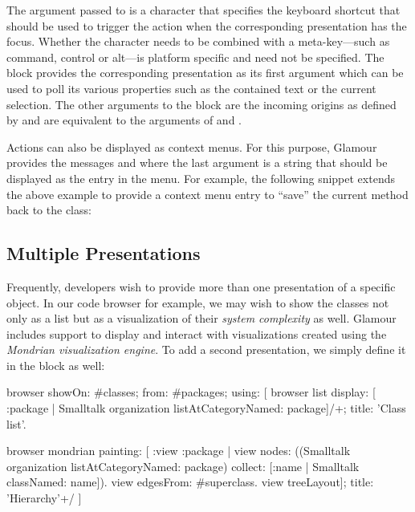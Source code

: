 \documentclass[a4paper,10pt,twoside]{book}
\begin{document}
The argument passed to  is a character that specifies the
keyboard shortcut that should be used to trigger the action when the
corresponding presentation has the focus. Whether the character needs
to be combined with a meta-key---such as command, control or alt---is
platform specific and need not be specified. The  block
provides the corresponding presentation as its first argument which
can be used to poll its various properties such as the contained text
or the current selection. The other arguments to the block are the
incoming origins as defined by  and are equivalent to the
arguments of  and .

Actions can also be displayed as context menus. For this purpose,
Glamour provides the messages  and
 where the last argument is a string that should be
displayed as the entry in the menu. For example, the following snippet
extends the above example to provide a context menu entry to ``save''
the current method back to the class:

\subsection{Multiple Presentations}

Frequently, developers wish to provide more than one presentation of a
specific object. In our code browser for example, we may wish to show
the classes not only as a list but as a visualization of their
\emph{system complexity} as well. Glamour includes support to display
and interact with visualizations created using the \emph{Mondrian
  visualization engine}. To add a second presentation, we simply
define it in the  block as well:

\begin{code}{}
browser showOn: #classes; from: #packages; using: [
	browser list
        display: [ :package | Smalltalk organization listAtCategoryNamed: package]/+;
        title: 'Class list'.

	browser mondrian
             painting: [ :view :package |
		view nodes: ((Smalltalk organization listAtCategoryNamed: package)
                                    collect: [:name | Smalltalk classNamed: name]).
		view edgesFrom: #superclass.
		view treeLayout];
             title: 'Hierarchy'+/
]
\end{code}
\end{document}
